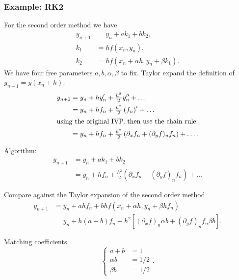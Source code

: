 \documentclass{beamer}
\begin{document}
\begin{frame}
  \frametitle{Example: RK2}

  \begin{overlayarea}{\textwidth}{0.8\textheight}
    {
      For the second order method we have
      \begin{align*}
        y_{n+1} & = y_n + a k_1 + b k_2, \\
        k_1 & = h f(x_n, y_n), \\
        k_2 & = h f(x_n + \alpha h, y_n + \beta k_1).
      \end{align*}
      We have four free parameters $a, b, \alpha, \beta$ to fix.
    }
    {
      Taylor expand the definition of $y_{n+1} = y(x_n + h)$:
      \begin{align*}
        y_{n+1} & = y_n + h y'_n + \tfrac{h^2}{2} y''_n + \dots \\
        & = y_n + h f_n +  \tfrac{h^2}{2} \left( f_n \right)' + \dots \\
        \intertext{using the original IVP, then use the chain rule:}
        & = y_n + h f_n +  \tfrac{h^2}{2} \left( \partial_x f_n +
          (\partial_y f)_n f_n \right) + \dots .
      \end{align*}
    }
    {
      Algorithm:
      \begin{align*}
        y_{n+1} & = y_n + a k_1 + b k_2 \\
        & = y_n + h f_n +  \tfrac{h^2}{2} \left( \partial_x f_n +
          (\partial_y f)_n f_n \right) + \dots
      \end{align*}

      Compare against the Taylor expansion of the second order
      method
      \begin{align*}
        y_{n+1} & = y_n + a h f_n + b h f(x_n + \alpha h, y_n + \beta h
        f_n) \\
        & = y_n + h (a + b) f_n + h^2 \left[ (\partial_x f)_n \alpha b +
          (\partial_y f)_n f_n \beta b \right].
      \end{align*}
    }
    {
      Matching coefficients
      \begin{equation*}
        \left\{
          \begin{aligned}
            a + b & = 1 \\
            \alpha b & = 1 / 2 \\
            \beta b & = 1 / 2
          \end{aligned}
          \right. .
      \end{equation*}
    }
  \end{overlayarea}

\end{frame}
\end{document}
